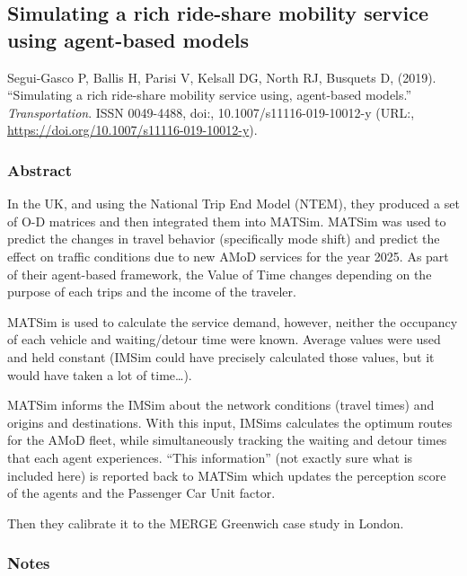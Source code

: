 \documentclass[
]{article}
\begin{document}
\hypertarget{simulating-a-rich-ride-share-mobility-service-using-agent-based-models}{%
\subsection{Simulating a rich ride-share mobility service using
agent-based
models}\label{simulating-a-rich-ride-share-mobility-service-using-agent-based-models}}

Segui-Gasco P, Ballis H, Parisi V, Kelsall DG, North RJ, Busquets D,
(2019). ``Simulating a rich ride-share mobility service using,
agent-based models.'' \emph{Transportation}. ISSN 0049-4488, doi:,
10.1007/s11116-019-10012-y (URL:,
\url{https://doi.org/10.1007/s11116-019-10012-y}).

\hypertarget{abstract-2}{%
\subsubsection{Abstract}\label{abstract-2}}

In the UK, and using the National Trip End Model (NTEM), they produced a
set of O-D matrices and then integrated them into MATSim. MATSim was
used to predict the changes in travel behavior (specifically mode shift)
and predict the effect on traffic conditions due to new AMoD services
for the year 2025. As part of their agent-based framework, the Value of
Time changes depending on the purpose of each trips and the income of
the traveler.

MATSim is used to calculate the service demand, however, neither the
occupancy of each vehicle and waiting/detour time were known. Average
values were used and held constant (IMSim could have precisely
calculated those values, but it would have taken a lot of time\ldots).

MATSim informs the IMSim about the network conditions (travel times) and
origins and destinations. With this input, IMSims calculates the optimum
routes for the AMoD fleet, while simultaneously tracking the waiting and
detour times that each agent experiences. ``This information'' (not
exactly sure what is included here) is reported back to MATSim which
updates the perception score of the agents and the Passenger Car Unit
factor.

Then they calibrate it to the MERGE Greenwich case study in London.

\hypertarget{notes-2}{%
\subsubsection{Notes}\label{notes-2}}
\end{document}
